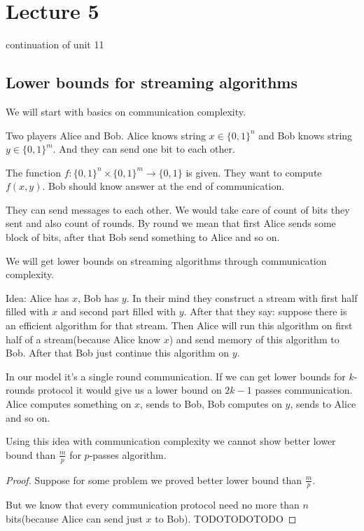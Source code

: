 \section{Lecture 5}

continuation of unit 11

\subsection{Lower bounds for streaming algorithms}

We will start with basics on communication complexity.

\begin{df}
	Two players Alice and Bob. Alice knows string $x \in \{0, 1\}^n$ and Bob knows string $y \in \{0, 1\}^m$. And they can send one bit to each other. 
	
	The function $f \colon \{0, 1\}^n \times \{0, 1\}^m \to \{0, 1\}$ is given. They want to compute $f(x, y)$. Bob should know answer at the end of communication.
	
	They can send messages to each other. 
	We would take care of count of bits they sent and also count of rounds. By round we mean that first Alice sends some block of bits, after that Bob send something to Alice and so on.
\end{df}

We will get lower bounds on streaming algorithms through communication complexity.

\begin{remrk}
	Idea: Alice has $x$, Bob has $y$.
	In their mind they construct a stream with first half filled with $x$ and second part filled with $y$. After that they say: suppose there is an efficient algorithm for that stream. Then Alice will run this algorithm on first half of a stream(because Alice know $x$) and send memory of this algorithm to Bob. After that Bob just continue this algorithm on $y$.
	
	In our model it's a single round communication. If we can get lower bounds for $k$-rounds protocol it would give us a lower bound on $2k - 1$ passes communication.
	Alice computes something on $x$, sends to Bob, Bob computes on $y$, sends to Alice and so on.
\end{remrk}

\begin{claim}
	Using this idea with communication complexity we cannot show better lower bound than $\frac m p$ for $p$-passes algorithm. 
\end{claim}
\begin{proof}
	Suppose for some problem we proved better lower bound than $\frac m p$. 
	
	But we know that every communication protocol need no more than $n$ bits(because Alice can send just $x$ to Bob).
	TODOTODOTODO
\end{proof}


